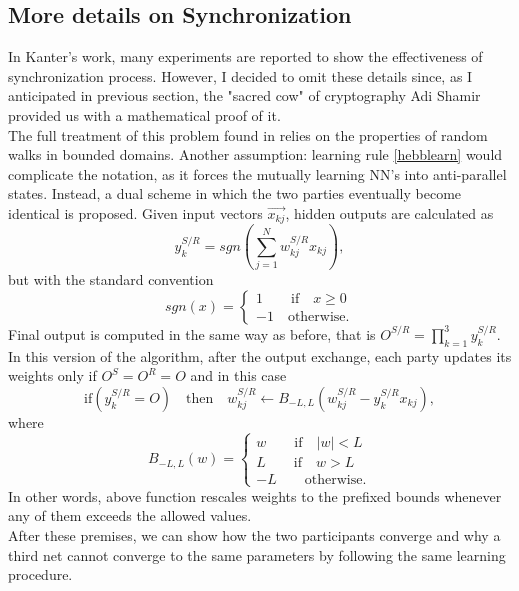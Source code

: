 \documentclass[%
    corpo=11pt,
    twoside,
    stile=classica,
    oldstyle,
    autoretitolo,
    tipotesi=magistrale,
    greek,
    evenboxes,
    english
]{toptesi}
\begin{document}
\subsection{More details on Synchronization}
\label{ssc:synchro}
In Kanter's work, many experiments are reported to show the effectiveness of synchronization process. However, I decided to omit these details since, as I anticipated in previous section, the "sacred cow" of cryptography Adi Shamir provided us with a mathematical proof of it. \\
The full treatment of this problem found in \cite{shamir} relies on the properties of random walks in bounded domains. Another assumption: learning rule \ref{hebblearn} would complicate the notation, as it forces the mutually learning NN's into anti-parallel states. Instead, a dual scheme in which the two parties eventually become identical is proposed. Given input vectors $\vec{x_{kj}}$, hidden outputs are calculated as
\begin{equation}
y_k^{S/R} = sgn\left(\sum_{j=1}^{N}w_{kj}^{S/R}x_{kj}\right),
\end{equation}
but with the standard convention 
\begin{equation}
sgn(x) = \begin{cases}
1 \qquad \text{if} \quad x \geq 0 \\
-1 \quad \text{otherwise.}
\end{cases}
\end{equation}
Final output is computed in the same way as before, that is $O^{S/R} = \prod_{k=1}^{3}y_k^{S/R}$. In this version of the algorithm, after the output exchange, each party updates its weights only if $O^S=O^R=O$ and in this case 
\begin{equation}
\label{shamirlearn}
\text{if} \left(y_k^{S/R}=O\right) \quad \text{then} \quad 
w_{kj}^{S/R} \leftarrow B_{-L,L}\left(w_{kj}^{S/R} - y_k^{S/R}x_{kj}\right),
\end{equation}
where
\begin{equation}
\label{rebound}
B_{-L,L}(w) = \begin{cases}
w \qquad \text{if} \quad |w|<L \\
L \qquad \text{if} \quad w>L \\
-L \qquad \text{otherwise}.
\end{cases}
\end{equation}
In other words, above function rescales weights to the prefixed bounds whenever any of them exceeds the allowed values. \\
After these premises, we can show how the two participants converge and why a third net cannot converge to the same parameters by following the same learning procedure. \\
\end{document}
